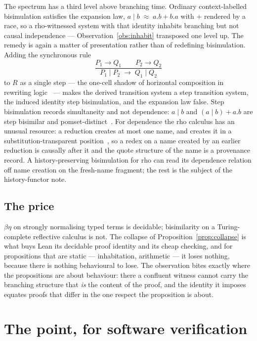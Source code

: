 \documentclass[11pt]{article}
\theoremstyle{plain}
\theoremstyle{definition}
\theoremstyle{remark}
\newcommand{\bis}{\;\approx\;}
\begin{document}
The spectrum has a third level above branching time. Ordinary context-labelled
bisimulation satisfies the expansion law, $a \mid b \bis a.b + b.a$ with $+$
rendered by a race, so a rho-witnessed system with that identity inhabits
branching but not causal independence --- Observation~\ref{obs:inhabit}
transposed one level up. The remedy is again a matter of presentation rather
than of redefining bisimulation. Adding the synchronous rule
\[
\frac{P_1 \to Q_1 \qquad P_2 \to Q_2}{P_1 \mid P_2 \;\to\; Q_1 \mid Q_2}
\tag{Par-2}
\]
to $R$ as a single step --- the one-cell shadow of horizontal composition in
rewriting logic~\cite{Meseguer92} --- makes the derived transition system a
step transition system, the induced identity step bisimulation, and the
expansion law false. Step bisimulation records simultaneity and not
dependence: $a \mid b$ and $(a \mid b) + a.b$ are step bisimilar and
pomset-distinct~\cite{GlabbeekGoltz}. For dependence the rho calculus has an
unusual resource: a reduction creates at most one name, and creates it in a
substitution-transparent position~\cite{NoWNS}, so a redex on a name created
by an earlier reduction is causally after it and the quote structure of the
name is a provenance record. A history-preserving bisimulation for rho can read
its dependence relation off name creation on the fresh-name fragment; the rest
is the subject of the history-functor note.

\subsection{The price}

$\beta\eta$ on strongly normalising typed terms is decidable; bisimilarity on
a Turing-complete reflective calculus is not. The collapse of
Proposition~\ref{prop:collapse} is what buys Lean its decidable proof
identity and its cheap checking, and for propositions that are static ---
inhabitation, arithmetic --- it loses nothing, because there is nothing
behavioural to lose. The observation bites exactly where the propositions are
about behaviour: there a confluent witness cannot carry the branching
structure that \emph{is} the content of the proof, and the identity it imposes
equates proofs that differ in the one respect the proposition is about.

\section{The point, for software verification}\label{sec:verification}
\end{document}
